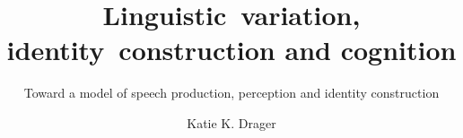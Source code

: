 \title{\mbox{Linguistic variation,} \mbox{identity construction} and cognition}
\subtitle{Toward a model of speech production, perception and identity construction}
\author{Katie K. Drager}
\renewcommand{\lsISBNdigital}{978-3-946234-24-1}
\renewcommand{\lsISBNhardcover}{978-3-946234-25-8}
\renewcommand{\lsISBNsoftcover}{978-3-946234-26-5}
\renewcommand{\lsSeries}{silp} %
\renewcommand{\lsSeriesNumber}{2} %
